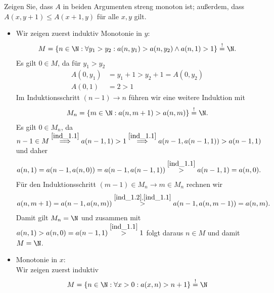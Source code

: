 
\begin{exercise}[208]

Zeigen Sie, dass $A$ in beiden Argumenten streng monoton ist; außerdem, dass
$A(x,y+1) \leq A(x+1,y)$ für alle $x,y$ gilt.

\end{exercise}


\begin{solution}
\phantom{}
\begin{itemize}
  \item Wir zeigen zuerst induktiv Monotonie in $y$:
  \begin{align}\label{ind_1.1}
    M = \{n \in \N: \forall y_1 > y_2: a(n,y_1) > a(n,y_2) \land a(n,1) > 1\} \stackrel{!}{=} \N.
  \end{align}
  Es gilt $0 \in M$, da für $y_1 > y_2$
  \begin{align*}
    A(0,y_1) &= y_1 + 1 > y_2 + 1 = A(0,y_2) \\
    A(0,1) &= 2 > 1
  \end{align*}
  Im Induktionsschritt $(n-1) \rightarrow n$ führen wir eine weitere Induktion mit
  \begin{align}\label{ind_1.2}
    M_n = \{m \in \N: a(n,m+1) > a(n,m)\} \stackrel{!}{=} \N.
  \end{align}
  Es gilt $0 \in M_n$, da $n-1 \in M \stackrel{\eqref{ind_1.1}}{\implies}
  a(n-1,1) > 1 \stackrel{\eqref{ind_1.1}}{\implies} a(n-1,a(n-1,1)) > a(n-1,1)$ und daher
  \begin{align*}
    a(n,1) = a(n-1,a(n,0)) = a(n-1,a(n-1,1)) \stackrel{\eqref{ind_1.1}}{>} a(n-1,1) = a(n,0).
  \end{align*}
  Für den Induktionsschritt $(m-1) \in M_n \rightarrow m \in M_n $ rechnen wir
  \begin{align*}
    a(n,m+1) = a(n-1,a(n,m)) \stackrel{\eqref{ind_1.2},\eqref{ind_1.1}}{>} a(n-1,a(n,m-1)) = a(n,m).
  \end{align*}
  Damit gilt $M_n = \N$ und zusammen mit $a(n,1) > a(n,0) = a(n-1,1) \stackrel{\eqref{ind_1.1}}{>} 1$ folgt daraus
  $n \in M$ und damit $M = \N$.
  \item Monotonie in $x$: \\
  Wir zeigen zuerst induktiv
  \begin{align}\label{hilf1}
    M = \{n \in \N: \forall x > 0: a(x,n) > n + 1\} \stackrel{!}{=} \N

\end{align}
\end{itemize}
\end{solution}
